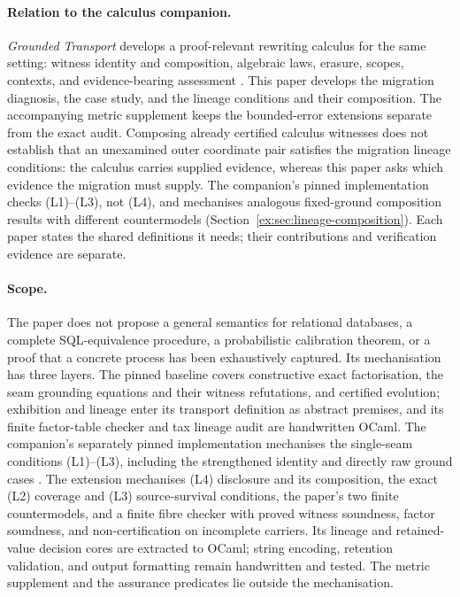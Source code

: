\documentclass[smallextended,envcountsect,envcountsame,natbib]{svjour3}
\begin{document}
\paragraph{Relation to the calculus companion.} \emph{Grounded Transport} develops a proof-relevant rewriting calculus for the same setting: witness identity and composition, algebraic laws, erasure, scopes, contexts, and evidence-bearing assessment \citep{moore2026transport}. This paper develops the migration diagnosis, the case study, and the lineage conditions and their composition. The accompanying metric supplement keeps the bounded-error extensions separate from the exact audit. Composing already certified calculus witnesses does not establish that an unexamined outer coordinate pair satisfies the migration lineage conditions: the calculus carries supplied evidence, whereas this paper asks which evidence the migration must supply. The companion's pinned implementation checks (L1)--(L3), not (L4), and mechanises analogous fixed-ground composition results with different countermodels (Section~\ref{ex:sec:lineage-composition}). Each paper states the shared definitions it needs; their contributions and verification evidence are separate.

\paragraph{Scope.} The paper does not propose a general semantics for relational databases, a complete SQL-equivalence procedure, a probabilistic calibration theorem, or a proof that a concrete process has been exhaustively captured. Its mechanisation has three layers. The pinned baseline covers constructive exact factorisation, the seam grounding equations and their witness refutations, and certified evolution; exhibition and lineage enter its transport definition as abstract premises, and its finite factor-table checker and tax lineage audit are handwritten OCaml. The companion's separately pinned implementation mechanises the single-seam conditions (L1)--(L3), including the strengthened identity and directly raw ground cases \citep{moore2026transport}. The extension mechanises (L4) disclosure and its composition, the exact (L2) coverage and (L3) source-survival conditions, the paper's two finite countermodels, and a finite fibre checker with proved witness soundness, factor soundness, and non-certification on incomplete carriers. Its lineage and retained-value decision cores are extracted to OCaml; string encoding, retention validation, and output formatting remain handwritten and tested. The metric supplement and the assurance predicates lie outside the mechanisation.
\end{document}
